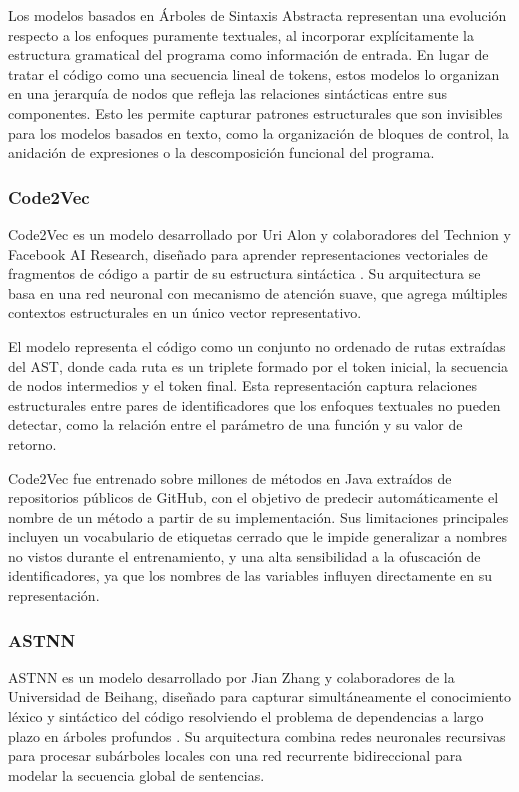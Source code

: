 Los modelos basados en Árboles de Sintaxis Abstracta representan una evolución 
respecto a los enfoques puramente textuales, al incorporar explícitamente la 
estructura gramatical del programa como información de entrada. En lugar de 
tratar el código como una secuencia lineal de tokens, estos modelos lo organizan 
en una jerarquía de nodos que refleja las relaciones sintácticas entre sus 
componentes. Esto les permite capturar patrones estructurales que son invisibles 
para los modelos basados en texto, como la organización de bloques de control, 
la anidación de expresiones o la descomposición funcional del programa.

\subsubsection{Code2Vec}

Code2Vec es un modelo desarrollado por Uri Alon y colaboradores del Technion y 
Facebook AI Research, diseñado para aprender representaciones vectoriales de 
fragmentos de código a partir de su estructura sintáctica \cite{Alon2018Code2Vec}. 
Su arquitectura se basa en una red neuronal con mecanismo de atención suave, 
que agrega múltiples contextos estructurales en un único vector representativo.

El modelo representa el código como un conjunto no ordenado de rutas extraídas 
del AST, donde cada ruta es un triplete formado por el token inicial, la 
secuencia de nodos intermedios y el token final. Esta representación captura 
relaciones estructurales entre pares de identificadores que los enfoques 
textuales no pueden detectar, como la relación entre el parámetro de una función 
y su valor de retorno.

Code2Vec fue entrenado sobre millones de métodos en Java extraídos de repositorios 
públicos de GitHub, con el objetivo de predecir automáticamente el nombre de un 
método a partir de su implementación. Sus limitaciones principales incluyen un 
vocabulario de etiquetas cerrado que le impide generalizar a nombres no vistos 
durante el entrenamiento, y una alta sensibilidad a la ofuscación de 
identificadores, ya que los nombres de las variables influyen directamente en 
su representación.

\subsubsection{ASTNN}

ASTNN es un modelo desarrollado por Jian Zhang y colaboradores de la Universidad 
de Beihang, diseñado para capturar simultáneamente el conocimiento léxico y 
sintáctico del código resolviendo el problema de dependencias a largo plazo en 
árboles profundos \cite{Zhang2019ASTNN}. Su arquitectura combina redes neuronales 
recursivas para procesar subárboles locales con una red recurrente bidireccional 
para modelar la secuencia global de sentencias.

